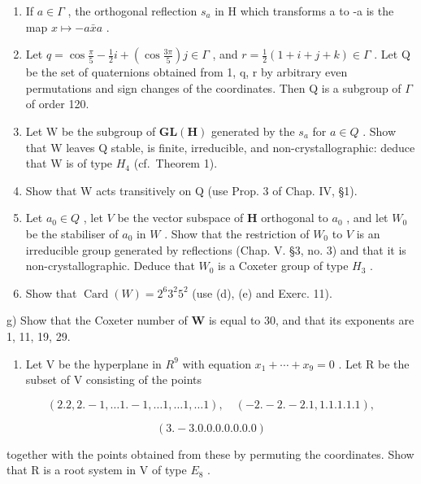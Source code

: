 \begin{enumerate}
\def\labelenumi{\alph{enumi})}
\item
  If \(a \in \Gamma\) , the orthogonal reflection \(s_{a}\) in H which transforms a to -a is the map \(x \mapsto -a\bar{x}a\) .
\item
  Let \(q = \cos \frac{\pi}{5} - \frac{1}{2}i + (\cos \frac{3\pi}{5})j \in \Gamma\) , and \(r = \frac{1}{2}(1 + i + j + k) \in \Gamma\) . Let Q be the set of quaternions obtained from 1, q, r by arbitrary even permutations and sign changes of the coordinates. Then Q is a subgroup of \(\Gamma\) of order 120.
\item
  Let W be the subgroup of \(\mathbf{GL}(\mathbf{H})\) generated by the \(s_{a}\) for \(a \in Q\) . Show that W leaves Q stable, is finite, irreducible, and non-crystallographic: deduce that W is of type \(H_{4}\) (cf.~Theorem 1).
\item
  Show that W acts transitively on Q (use Prop. 3 of Chap. IV, §1).
\item
  Let \(a_0 \in Q\) , let \(V\) be the vector subspace of \(\mathbf{H}\) orthogonal to \(a_0\) , and let \(W_0\) be the stabiliser of \(a_0\) in \(W\) . Show that the restriction of \(W_0\) to \(V\) is an irreducible group generated by reflections (Chap. V. §3, no. 3) and that it is non-crystallographic. Deduce that \(W_0\) is a Coxeter group of type \(H_3\) .
\item
  Show that \(\operatorname{Card}(W)=2^{6}3^{2}5^{2}\) (use (d), (e) and Exerc. 11).
\end{enumerate}

g) Show that the Coxeter number of \(\mathbf{W}\) is equal to 30, and that its exponents are 1, 11, 19, 29.

\begin{enumerate}
\def\labelenumi{\arabic{enumi})}
\setcounter{enumi}{12}
\tightlist
\item
  Let V be the hyperplane in \(R^{9}\) with equation \(x_{1} + \cdots + x_{9} = 0\) . Let R be the subset of V consisting of the points
\end{enumerate}

\[
(2. 2, 2. - 1, \dots 1. - 1, \dots 1, \dots 1, \dots 1), \quad (- 2. - 2. - 2. 1, 1. 1. 1. 1. 1),
\]

\[
(3. - 3. 0. 0. 0. 0. 0. 0. 0)
\]

together with the points obtained from these by permuting the coordinates. Show that R is a root system in V of type \(E_{8}\) .

